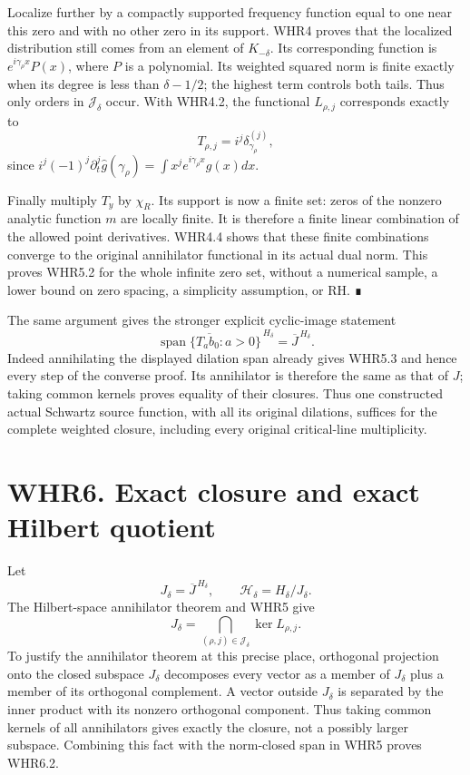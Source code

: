 Localize further by a compactly supported frequency function equal to
one near this zero and with no other zero in its support. WHR4 proves
that the localized distribution still comes from an element of
\(K_{-\delta}\). Its corresponding function is
\(e^{i\gamma_\rho x}P(x)\), where \(P\) is a polynomial. Its weighted
squared norm is finite exactly when its degree is less than
\(\delta-1/2\); the highest term controls both tails. Thus only orders
in \(\mathscr J_\delta\) occur. With WHR4.2, the functional
\(L_{\rho,j}\) corresponds exactly to \[
 T_{\rho,j}=i^j\delta_{\gamma_\rho}^{(j)},
\] since \(i^j(-1)^j\partial_t^j\widehat g(\gamma_\rho)=
\int x^je^{i\gamma_\rho x}g(x)dx\).

Finally multiply \(T_y\) by \(\chi_R\). Its support is now a finite set:
zeros of the nonzero analytic function \(m\) are locally finite. It is
therefore a finite linear combination of the allowed point derivatives.
WHR4.4 shows that these finite combinations converge to the original
annihilator functional in its actual dual norm. This proves WHR5.2 for
the whole infinite zero set, without a numerical sample, a lower bound
on zero spacing, a simplicity assumption, or RH. ∎

The same argument gives the stronger explicit cyclic-image statement \[
 \boxed{\overline{\operatorname{span}\{T_ab_0:a>0\}}^{\,H_\delta}
            =\overline J^{\,H_\delta}.}
 \tag{WHR5.5}
\] Indeed annihilating the displayed dilation span already gives WHR5.3
and hence every step of the converse proof. Its annihilator is therefore
the same as that of \(J\); taking common kernels proves equality of
their closures. Thus one constructed actual Schwartz source function,
with all its original dilations, suffices for the complete weighted
closure, including every original critical-line multiplicity.

\section{WHR6. Exact closure and exact Hilbert
quotient}\label{whr6.-exact-closure-and-exact-hilbert-quotient}

Let \[
 J_\delta=\overline J^{\,H_\delta},\qquad
 \mathcal H_\delta=H_\delta/J_\delta.
 \tag{WHR6.1}
\] The Hilbert-space annihilator theorem and WHR5 give \[
 \boxed{J_\delta=
 \bigcap_{(\rho,j)\in\mathscr J_\delta}\ker L_{\rho,j}.}
 \tag{WHR6.2}
\] To justify the annihilator theorem at this precise place, orthogonal
projection onto the closed subspace \(J_\delta\) decomposes every vector
as a member of \(J_\delta\) plus a member of its orthogonal complement.
A vector outside \(J_\delta\) is separated by the inner product with its
nonzero orthogonal component. Thus taking common kernels of all
annihilators gives exactly the closure, not a possibly larger subspace.
Combining this fact with the norm-closed span in WHR5 proves WHR6.2.

